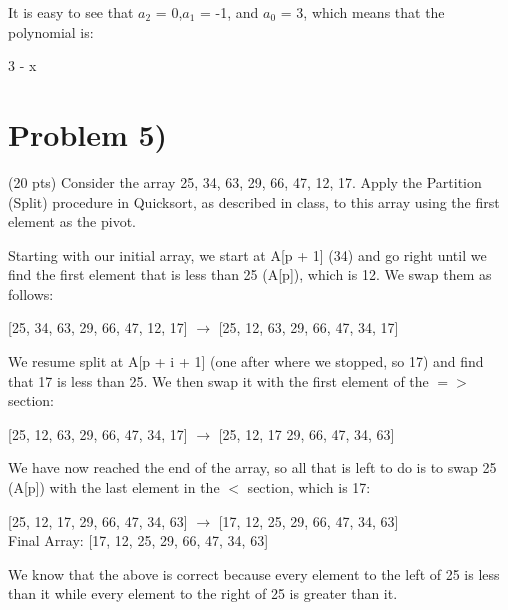 \documentclass{article}
\begin{document}
It is easy to see that $a_2$ = 0,$a_1$ = -1, and $a_0$ = 3, which means that the polynomial is:

\begin{center}
3 - x
\end{center} 

\section*{Problem 5)} (20 pts) Consider the array 25, 34, 63, 29, 66, 47, 12, 17.
Apply the Partition (Split) procedure in Quicksort, as described in class, to this array using the first element as the pivot.

Starting with our initial array, we start at A[p + 1] (34) and go right until we find the first element that is less than 25 (A[p]), which is 12. We swap them as follows: 
\begin{center}
[25, 34, 63, 29, 66, 47, 12, 17] $\rightarrow$ [25, 12, 63, 29, 66, 47, 34, 17]
\end{center}

We resume split at A[p + i + 1] (one after where we stopped, so 17) and find that 17 is less than 25. We then swap it with the first element of the $=>$ section: 

\begin{center}
[25, 12, 63, 29, 66, 47, 34, 17] $\rightarrow$ [25, 12, 17 29, 66, 47, 34, 63]
\end{center}

We have now reached the end of the array, so all that is left to do is to swap 25 (A[p]) with the last element in the $<$ section, which is 17:

\begin{center}
[25, 12, 17, 29, 66, 47, 34, 63] $\rightarrow$ [17, 12, 25, 29, 66, 47, 34, 63] \newline
\\
Final Array: [17, 12, 25, 29, 66, 47, 34, 63]
\end{center}

We know that the above is correct because every element to the left of 25 is less than it while every element to the right of 25 is greater than it.
\end{document}
